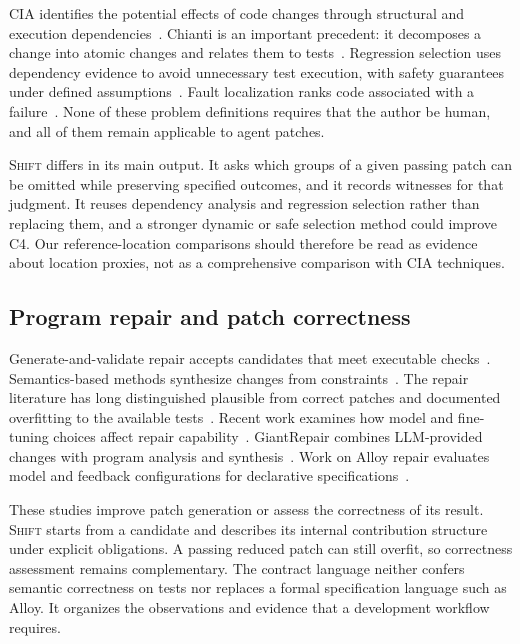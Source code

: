 \documentclass[a4paper,fleqn]{cas-sc}
\newcommand{\tool}{\textsc{Shift}}
\begin{document}
CIA identifies the potential effects of code changes through structural and execution dependencies~\citep{bohner1996cia,li2013cia,orso2003field}. Chianti is an important precedent: it decomposes a change into atomic changes and relates them to tests~\citep{ren2004chianti}. Regression selection uses dependency evidence to avoid unnecessary test execution, with safety guarantees under defined assumptions~\citep{rothermel1997safe,gligoric2015ekstazi}. Fault localization ranks code associated with a failure~\citep{wong2016fl}. None of these problem definitions requires that the author be human, and all of them remain applicable to agent patches.

\tool{} differs in its main output. It asks which groups of a given passing patch can be omitted while preserving specified outcomes, and it records witnesses for that judgment. It reuses dependency analysis and regression selection rather than replacing them, and a stronger dynamic or safe selection method could improve C4. Our reference-location comparisons should therefore be read as evidence about location proxies, not as a comprehensive comparison with CIA techniques.

\subsection{Program repair and patch correctness}

Generate-and-validate repair accepts candidates that meet executable checks~\citep{legoues2012genprog}. Semantics-based methods synthesize changes from constraints~\citep{nguyen2013semfix,mechtaev2016angelix}. The repair literature has long distinguished plausible from correct patches and documented overfitting to the available tests~\citep{qi2015kali,smith2015cure,wang2020apr}. Recent work examines how model and fine-tuning choices affect repair capability~\citep{huang2025comprehensive}. GiantRepair combines LLM-provided changes with program analysis and synthesis~\citep{li2025hybrid}. Work on Alloy repair evaluates model and feedback configurations for declarative specifications~\citep{alhanahnah2025specifications}.

These studies improve patch generation or assess the correctness of its result. \tool{} starts from a candidate and describes its internal contribution structure under explicit obligations. A passing reduced patch can still overfit, so correctness assessment remains complementary. The contract language neither confers semantic correctness on tests nor replaces a formal specification language such as Alloy. It organizes the observations and evidence that a development workflow requires.
\end{document}
